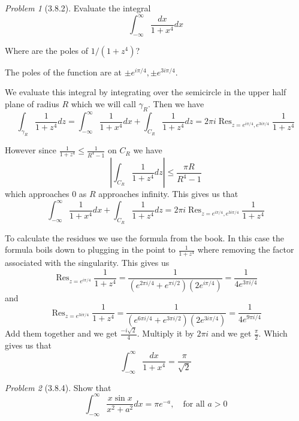 \documentclass[10pt]{article}
\newcommand{\sk}{\vskip 10mm}
\DeclareMathOperator{\Res}{Res}
\theoremstyle{remark}
\newtheorem{problem}{Problem}
\theoremstyle{remark}
\begin{document}
\sk

\begin{problem}[3.8.2]
  Evaluate the integral
  \[
    \int_{-\infty}^\infty \frac{dx}{1+x^4}dx
  \]

  Where are the poles of $1/(1+z^4)$?
\end{problem}

The poles of the function are at $\pm e^{i\pi/4},\pm e^{3i\pi/4}$.

We evaluate this integral by integrating over the semicircle in the
upper half plane of radius $R$ which we will call $\gamma_R$. Then we have
\[
  \int_{\gamma_R}\frac{1}{1+z^4} dz = \int_{-\infty}^\infty \frac{1}{1+x^4}dx+\int_{C_R}\frac{1}{1+z^4}dz= 2\pi i\Res_{z=e^{i\pi/4},e^{3i\pi/4}}\frac{1}{1+z^4}
\]

However since $\frac{1}{1+z^4}\leq\frac{1}{R^4-1}$ on $C_R$ we have
\[
  \left|\int_{C_R}\frac{1}{1+z^4}dz\right|\leq\frac{\pi R}{R^4-1}
\]
which approaches $0$ as $R$ approaches infinity. This gives us that
\[
  \int_{-\infty}^\infty \frac{1}{1+x^4}dx+\int_{C_R}\frac{1}{1+z^4}dz= 2\pi i\Res_{z=e^{i\pi/4},e^{3i\pi/4}}\frac{1}{1+z^4}
\]

To calculate the residues we use the formula from the book. In this case the
formula boils down to plugging in the point to $\frac{1}{1+z^4}$ where removing the factor
associated with the singularity. This gives us
\[
  \Res_{z=e^{i\pi/4}}\frac{1}{1+z^4}=\frac{1}{(e^{2\pi i/4}+e^{\pi i/2})(2e^{i\pi/4})}=\frac{1}{4e^{3\pi i/4}}
\]
and
\[
  \Res_{z=e^{3i\pi/4}}\frac{1}{1+z^4}=\frac{1}{(e^{6\pi i/4}+e^{3\pi i/2})(2e^{3i\pi/4})}=\frac{1}{4e^{9\pi i/4}}
\]
Add them together and we get $\frac{-i\sqrt{2}}{4}$. Multiply it by $2\pi i$ and
we get $\frac{\pi}{2}$. Which gives us that
\[
  \int_{-\infty}^\infty \frac{dx}{1+x^4} = \frac{\pi}{\sqrt{2}}
\]

\sk

\begin{problem}[3.8.4]
  Show that
  \[
    \int_{-\infty}^\infty\frac{x\sin x}{x^2+a^2}dx=\pi e^{-a},\quad \text{for all $a>0$}
  \]
\end{problem}
\end{document}
